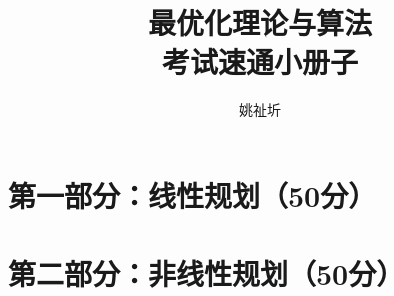 \documentclass[14pt]{extarticle}
\title{\textbf{最优化理论与算法\\[2mm]考试速通小册子}}
\author{姚祉圻 \quad 2025018017}
\date{}
\begin{document}
\sloppy
\maketitle

\setcounter{secnumdepth}{-1}
\setcounter{tocdepth}{1}

\section{第一部分：线性规划（50分）}






\section{第二部分：非线性规划（50分）}






\end{document}
